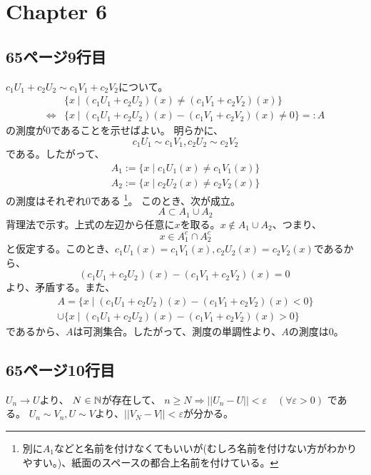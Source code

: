   \section{Chapter 6}
    \subsection{65ページ9行目}
      $c_1U_1 + c_2U_2 \sim c_1V_1 + c_2V_2$について。\\
      \begin{align*}
        &\{x \mid (c_1U_1 + c_2U_2)(x) \neq (c_1V_1 + c_2V_2)(x)\} \\
        \Leftrightarrow &\{x \mid (c_1U_1 + c_2U_2)(x) - (c_1V_1 + c_2V_2)(x) \neq 0\} =: A
      \end{align*}
      の測度が$0$であることを示せばよい。
      明らかに、
      \[
        c_1U_1 \sim c_1V_1, c_2U_2 \sim c_2V_2
      \]
      である。したがって、
      \begin{align*}
        A_1 := \{x \mid c_1U_1(x) \neq c_1V_1(x)\} \\
        A_2 := \{x \mid c_2U_2(x) \neq c_2V_2(x)\}
      \end{align*}
      の測度はそれぞれ$0$である
      \footnote{別に$A_1$などと名前を付けなくてもいいが(むしろ名前を付けない方がわかりやすい。)、紙面のスペースの都合上名前を付けている。}。
      このとき、次が成立。
      \[
        A \subset A_1 \cup A_2
      \]
      背理法で示す。上式の左辺から任意に$x$を取る。$x \notin A_1 \cup A_2$、つまり、
      \[
        x \in A_1^c \cap A_2^c
        \]
      と仮定する。このとき、$c_1U_1(x) = c_1V_1(x), c_2U_2(x) = c_2V_2(x)$であるから、
      \[
        (c_1U_1 + c_2U_2)(x) - (c_1V_1 + c_2V_2)(x) = 0\
      \]
      より、矛盾する。また、
      \begin{multline*}
        A = \{x \mid (c_1U_1 + c_2U_2)(x) - (c_1V_1 + c_2V_2)(x) < 0\} \\
        \cup \{x \mid (c_1U_1 + c_2U_2)(x) - (c_1V_1 + c_2V_2)(x) > 0\}
      \end{multline*}
      であるから、$A$は可測集合。したがって、測度の単調性より、$A$の測度は$0$。

    \subsection{65ページ10行目}
      $U_n \to U$より、
      $N \in {\mathbb{N}}$が存在して、
      $n \ge N \Rightarrow ||U_n - U|| < \varepsilon \quad (\forall \varepsilon > 0)$
      である。
      $U_n \sim V_n, U \sim V$より、$||V_N - V|| < \varepsilon$が分かる。

